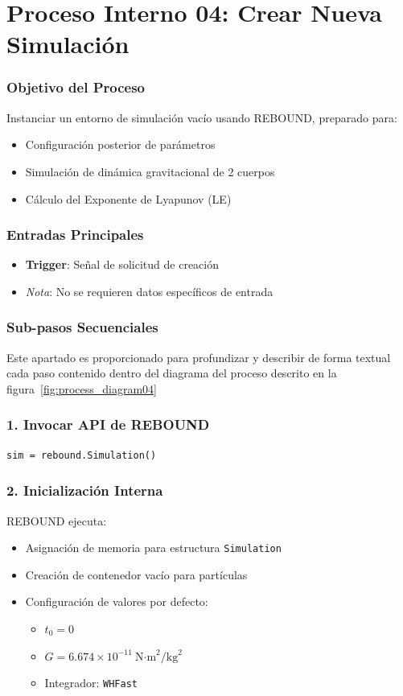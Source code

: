 \section*{Proceso Interno 04: Crear Nueva Simulación}

\subsubsection{Objetivo del Proceso}
Instanciar un entorno de simulación vacío usando REBOUND, preparado para:
\begin{itemize}
    \item Configuración posterior de parámetros
    \item Simulación de dinámica gravitacional de 2 cuerpos
    \item Cálculo del Exponente de Lyapunov (LE)
\end{itemize}

\subsubsection{Entradas Principales}
\begin{itemize}
    \item \textbf{Trigger}: Señal de solicitud de creación
    \item \textit{Nota}: No se requieren datos específicos de entrada
\end{itemize}

\subsubsection{Sub-pasos Secuenciales}
Este apartado es proporcionado para profundizar y describir de forma textual cada paso contenido dentro del diagrama del proceso descrito en la figura~\ref{fig:process_diagram04}
\subsubsection*{1. Invocar API de REBOUND}
\begin{verbatim}
sim = rebound.Simulation()
\end{verbatim}

\subsubsection*{2. Inicialización Interna}
REBOUND ejecuta:
\begin{itemize}
    \item Asignación de memoria para estructura \texttt{Simulation}
    \item Creación de contenedor vacío para partículas
    \item Configuración de valores por defecto:
    \begin{itemize}
        \item $t_0 = 0$
        \item $G = 6.674\times10^{-11}\ \text{N·m}^2/\text{kg}^2$
        \item Integrador: \texttt{WHFast}
    \end{itemize}
\end{itemize}

